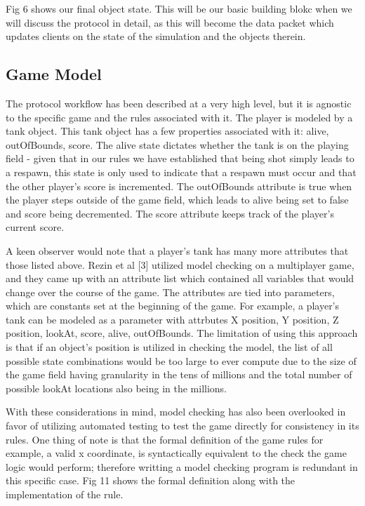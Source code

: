 \documentclass[conference]{IEEEtran}
\begin{document}
Fig 6 shows our final object state. This will be our basic building blokc when we will discuss the protocol in detail,
as this will become the data packet which updates clients on the state of the simulation and the objects therein.

\subsection{Game Model}

The protocol workflow has been described at a very high level, but it is agnostic to the specific game and the rules associated with it. The
player is modeled by a tank object. This tank object has a few properties associated with it: alive, outOfBounds, score. The alive state
dictates whether the tank is on the playing field - given that in our rules we have established that being shot simply leads to a respawn,
this state is only used to indicate that a respawn must occur and that the other player's score is incremented. The outOfBounds attribute is true
when the player steps outside of the game field, which leads to alive being set to false and score being decremented. The score attribute
keeps track of the player's current score.

A keen observer would note that a player's tank has many more attributes that those listed above. Rezin et al [3] utilized model checking
on a multiplayer game, and they came up with an attribute list which contained all variables that would change over the course of the game.
The attributes are tied into parameters, which are constants set at the beginning of the game. For example, a player's tank can be modeled
as a parameter with attrbutes X position, Y position, Z position, lookAt, score, alive, outOfBounds. The limitation of using this approach is that
if an object's position is utilized in checking the model, the list of all possible state combinations would be too large to ever compute due
to the size of the game field having granularity in the tens of millions and the total number of possible lookAt locations also being in the millions.

With these considerations in mind, model checking has also been overlooked in favor of utilizing automated testing to test the
game directly for consistency in its rules. One thing of note is that the formal definition of the game rules for example, a valid x coordinate,
is syntactically equivalent to the check the game logic would perform; therefore writting a model checking program is redundant in this specific
case. Fig 11 shows the formal definition along with the implementation of the rule.
\end{document}
